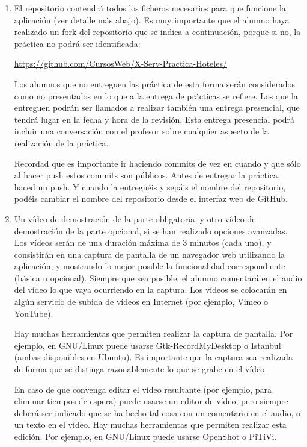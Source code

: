 \begin{enumerate}
  \item El repositorio contendrá todos los ficheros necesarios para que funcione la aplicación (ver detalle más abajo). Es muy importante que el alumno haya realizado un fork del repositorio que se indica a continuación, porque si no, la práctica no podrá ser identificada: 

\url{https://github.com/CursosWeb/X-Serv-Practica-Hoteles/}

Los alumnos que no entreguen las práctica de esta forma serán considerados como no presentados en lo que a la entrega de prácticas se refiere. Los que la entreguen podrán ser llamados a realizar también una entrega presencial, que tendrá lugar en la fecha y hora de la revisión. Esta entrega presencial podrá incluir una conversación con el profesor sobre cualquier aspecto de la realización de la práctica.

Recordad que es importante ir haciendo commits de vez en cuando y que sólo al hacer push estos commits son públicos. Antes de entregar la práctica, haced un push. Y cuando la entreguéis y sepáis el nombre del repositorio, podéis cambiar el nombre del repositorio desde el interfaz web de GitHub. 
 
 \item Un vídeo de demostración de la parte obligatoria, y otro vídeo de demostración de la parte opcional, si se han realizado opciones avanzadas. Los vídeos serán de una duración máxima de 3 minutos (cada uno), y consistirán en una captura de pantalla de un navegador web utilizando la aplicación, y mostrando lo mejor posible la funcionalidad correspondiente (básica u opcional). Siempre que sea posible, el alumno comentará en el audio del vídeo lo que vaya ocurriendo en la captura. Los vídeos se colocarán en algún servicio de subida de vídeos en Internet (por ejemplo, Vimeo o YouTube).

Hay muchas herramientas que permiten realizar la captura de pantalla. Por ejemplo, en GNU/Linux puede usarse Gtk-RecordMyDesktop o Istanbul (ambas disponibles en Ubuntu). Es importante que la captura sea realizada de forma que se distinga razonablemente lo que se grabe en el vídeo.

En caso de que convenga editar el vídeo resultante (por ejemplo, para eliminar tiempos de espera) puede usarse un editor de vídeo, pero siempre deberá ser indicado que se ha hecho tal cosa con un comentario en el audio, o un texto en el vídeo. Hay muchas herramientas que permiten realizar esta edición. Por ejemplo, en GNU/Linux puede usarse OpenShot o PiTiVi.


\end{enumerate}
